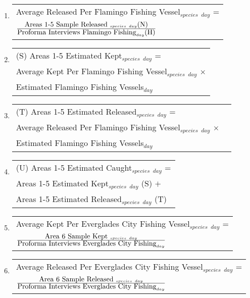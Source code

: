 \documentclass[letterpaper,12pt]{article}
\newcommand{\hspacer}{\hspace*{1cm}}
\newcommand{\fraction}[1]{\textrm{\normalsize{#1}}}
\begin{document}
\begin{enumerate}
\item
\begin{tabular}{l@{ }}
	Average Released Per Flamingo Fishing Vessel$_{species}$ $_{day}$ = \\
	\hspacer
	$
	\frac
	{\fraction{Areas 1-5 Sample Released}\ _{species}\ _{day} \fraction{(N)}}
	{\fraction{Proforma Interviews Flamingo Fishing} _{day}
		\fraction{(H)}}
	$
\end{tabular}

\item
\begin{tabular}{l@{ }}
	(S) Areas 1-5 Estimated Kept$_{species}$ $_{day}$ = \\
	 \hspacer Average Kept Per Flamingo Fishing Vessel$_{species}$ $_{day}$ $\times$ \\
	 \hspacer Estimated Flamingo Fishing Vessels$_{day}$
\end{tabular}

\item
\begin{tabular}{l@{ }l@{ }}
	(T) Areas 1-5 Estimated Released$_{species}$ $_{day}$ = \\
	  \hspacer Average Released Per Flamingo Fishing Vessel$_{species}$ $_{day}$ $\times$ \\
	  \hspacer Estimated Flamingo Fishing Vessels$_{day}$
\end{tabular}

\item
\begin{tabular}{l@{ }}
	(U) Areas 1-5 Estimated Caught$_{species}$ $_{day}$ = \\
		\hspacer Areas 1-5 Estimated Kept$_{species}$ $_{day}$ (S) $+$ \\
		\hspacer Areas 1-5 Estimated Released$_{species}$ $_{day}$ (T)
\end{tabular}

\item
\begin{tabular}{l@{ }}
	Average Kept Per Everglades City Fishing Vessel$_{species}$ $_{day}$ = \\
		\hspacer 
		$
		\frac
		{\fraction{Area 6 Sample Kept}\ _{species}\ _{day}}
		{\fraction{Proforma Interviews Everglades City Fishing} _{day}}
		$
\end{tabular}

\item
\begin{tabular}{l@{ }}
	Average Released Per Everglades City Fishing Vessel$_{species}$ $_{day}$ = \\
		\hspacer 
		$
		\frac
		{\fraction{Area 6 Sample Released}\ _{species}\ _{day}}
		{\fraction{Proforma Interviews Everglades City Fishing} _{day}}
		$
\end{tabular}


\end{enumerate}
\end{document}
